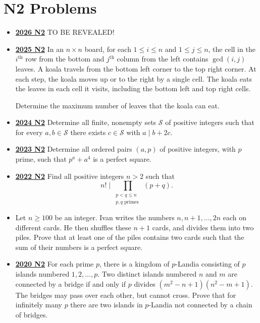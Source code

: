 \documentclass[11pt]{scrartcl}
\begin{document}
\section*{N2 Problems} \label{N2}
\begin{itemize}[leftmargin=*]


\item \href{https://www.imo-official.org/assets/documents/problems/2026/IMO2026SL.pdf}{\textbf{2026 N2}} TO BE REVEALED!

\item \href{https://artofproblemsolving.com/community/c6h3866850p38676934}{\textbf{2025 N2}} In an $n \times n$ board, for each $1 \leqslant i \leqslant n$ and $1 \leqslant j \leqslant n$, the cell in the $i^{\text{th}}$ row from the bottom and $j^{\text{th}}$ column from the left contains $\gcd(i,j)$ leaves. A koala travels from the bottom left corner to the top right corner. At each step, the koala moves up or to the right by a single cell. The koala eats the leaves in each cell it visits, including the bottom left and top right cells.

Determine the maximum number of leaves that the koala can eat.

\item \href{https://artofproblemsolving.com/community/c6h3610444p35340915}{\textbf{2024 N2}} Determine all finite, nonempty sets $\mathcal{S}$ of positive integers such that for every $a,b\in\mathcal{S}$ there exists $c\in\mathcal{S}$ with $a\mid b+2c$.	

\item \href{https://artofproblemsolving.com/community/c6h3359734p31218394}{\textbf{2023 N2}} Determine all ordered pairs $(a,p)$ of positive integers, with $p$ prime, such that $p^a+a^4$ is a perfect square.

\item \href{https://artofproblemsolving.com/community/c6h3107356p28104399}{\textbf{2022 N2}} 	Find all positive integers $n>2$ such that
$$ n! \mid \prod_{ \substack{p<q\leqslant n \\ p,q \text{ primes }} } (p+q).$$ 
\item {}  Let $n \geqslant  100$ be an integer. Ivan writes the numbers $n, n+1, \dots, 2 n$ each on different cards. He then shuffles these $n+1$ cards, and divides them into two piles. Prove that at least one of the piles contains two cards such that the sum of their numbers is a perfect square.
\item \href{https://artofproblemsolving.com/community/c6h2625867p22698104}{\textbf{2020 N2}} For each prime $p$, there is a kingdom of $p$-Landia consisting of $p$ islands numbered $1,2,\dots, p$. Two distinct islands numbered $n$ and $m$ are connected by a bridge if and only if  $p$ divides $(m^{2} -n + 1)(n^{2} -m + 1)$. The bridges may pass over each other, but cannot cross. Prove that for infinitely many $p$ there are two islands in $p$-Landia not connected by a chain of bridges.


\end{itemize}
\end{document}
